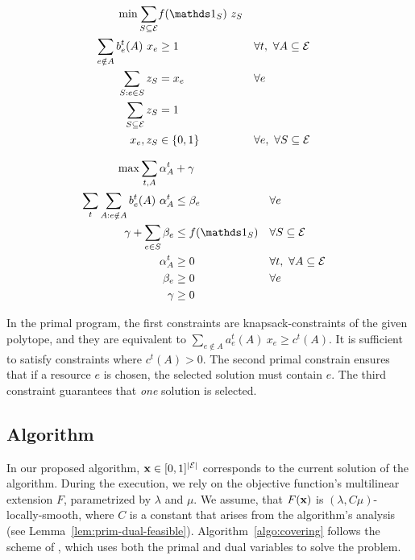 \vspace{-0.6cm}
\begin{minipage}[t]{0.45\textwidth}
	\begin{align*}
		\min  \sum_{S \subseteq \mathcal{E}} &f(\one_{S})\ z_{S} \\
		\sum_{e \notin A} b_{e}^{t}(A) \ x_{e} &\geq 1 & &  \forall t,\ \forall A \subseteq \mathcal{E} \\
		\sum_{S: e \in S} z_{S}  &= x_{e}	& & \forall e \\
		\sum_{S \subseteq \mathcal{E}} z_{S} &= 1 & & \\
		x_{e}, z_{S} &\in \{0,1\} & & \forall e,\ \forall S \subseteq \mathcal{E}\\
	\end{align*}
\end{minipage}
\quad
\begin{minipage}[t]{0.5\textwidth}
	\begin{align*}
		\max \sum_{t, A} \alpha^{t}_{A} &+ \gamma \\
		\sum_{t} \sum_{A: e \notin A} b_{e}^{t}(A) \ \alpha_{A}^{t} &\leq \beta_{e}  & &  \forall e \\
		\gamma + \sum_{e \in S} \beta_{e} &\leq f(\one_{S})  & & \forall S \subseteq \mathcal{E}\\
		\alpha^{t}_{A} &\geq 0 & & \forall t,\ \forall A \subseteq \mathcal{E}\\
		\beta_e &\geq 0 & & \forall e\\
		\gamma &\geq 0 & &
	\end{align*}
\end{minipage}
\vspace{-0.6cm}

In the primal program, the first constraints are knapsack-constraints \citep{CarrFleischer:2000} of the given polytope, and they are equivalent to $\sum_{e \notin A} a_{e}^{t}(A) \ x_{e} \geq c^{t}(A)$. It is sufficient to satisfy constraints where $c^{t}(A) > 0$. The second primal constrain ensures that if a resource $e$ is chosen, the selected solution must contain $e$.
The third constraint guarantees that \emph{one} solution is selected.

\subsection{Algorithm}
In our proposed algorithm, $\mathbf{x} \in [0, 1]^{|\mathcal{E}|}$ corresponds to the current solution of the algorithm. During the execution, we rely on the objective function's multilinear extension $F$, parametrized by $\lambda$ and $\mu$. We assume, that $F(\mathbf{x})$ is $(\lambda, C \mu)$-locally-smooth, where $C$ is a constant that arises from the algorithm's analysis (see Lemma~\ref{lem:prim-dual-feasible}). Algorithm~\ref{algo:covering} follows the scheme of \cite{Thang20:Online-Primal-Dual}, which uses both the primal and dual variables to solve the problem.

